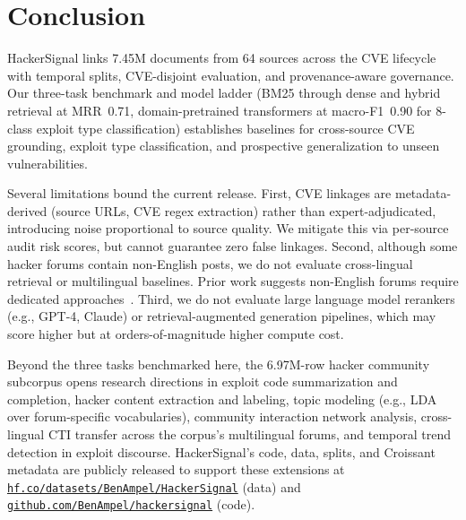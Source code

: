 \documentclass{article}
\begin{document}
\section{Conclusion}
\label{sec:discussion}

HackerSignal links 7.45M documents from 64 sources across the CVE lifecycle with temporal splits, CVE-disjoint evaluation, and provenance-aware governance. Our three-task benchmark and model ladder (BM25 through dense and hybrid retrieval at MRR~0.71, domain-pretrained transformers at macro-F1~0.90 for 8-class exploit type classification) establishes baselines for cross-source CVE grounding, exploit type classification, and prospective generalization to unseen vulnerabilities.

Several limitations bound the current release. First, CVE linkages are metadata-derived (source URLs, CVE regex extraction) rather than expert-adjudicated, introducing noise proportional to source quality. We mitigate this via per-source audit risk scores, but cannot guarantee zero false linkages. Second, although some hacker forums contain non-English posts, we do not evaluate cross-lingual retrieval or multilingual baselines. Prior work suggests non-English forums require dedicated approaches~\citep{ebrahimi2020crosslingual}. Third, we do not evaluate large language model rerankers (e.g., GPT-4, Claude) or retrieval-augmented generation pipelines, which may score higher but at orders-of-magnitude higher compute cost.

Beyond the three tasks benchmarked here, the 6.97M-row hacker community subcorpus opens research directions in exploit code summarization and completion, hacker content extraction and labeling, topic modeling (e.g., LDA over forum-specific vocabularies), community interaction network analysis, cross-lingual CTI transfer across the corpus's multilingual forums, and temporal trend detection in exploit discourse. HackerSignal's code, data, splits, and Croissant metadata are publicly released to support these extensions at \href{https://huggingface.co/datasets/BenAmpel/HackerSignal}{\texttt{hf.co/datasets/BenAmpel/HackerSignal}} (data) and \href{https://github.com/BenAmpel/hackersignal}{\texttt{github.com/BenAmpel/hackersignal}} (code).
\end{document}
